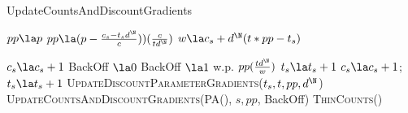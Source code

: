 \begin{algorithm}
	\caption{UpdateCountsAndDiscountGradients} \label{alg:updatecountsandgradients}
	\begin{algorithmic}[1]
	
		\State $pp \la p$
			\State $pp \la (p - \frac{c_s - t_s d^{\N}}{c}))(\frac{c}{t d^{\N}})$
			\State $w \la c_s	+ d^{\N}(t *pp - t_s)$		
		\EndIf
		
			\State $c_s \la c_s + 1$
			\State BackOff $\la 0$
			\State BackOff $\la 1$ w.p. $pp (\frac{t d^{\N}}{w})$ 
				\State $t_s \la t_s + 1$
			 \EndIf
				\State $c_s \la c_s + 1$;  $t_s \la t_s + 1$
		\EndIf
		\State \textsc{UpdateDiscountParameterGradients}($t_s, t,pp, d^{\N}$)
		\State \textsc{UpdateCountsAndDiscountGradients}(\textsc{PA}(\N), $s,pp$, BackOff)
		\State \textsc{ThinCounts}(\N)
	\EndFunction
		\end{algorithmic}
\end{algorithm}


